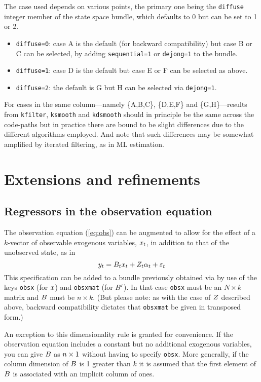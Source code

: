 The case used depends on various points, the primary one being the
\texttt{diffuse} integer member of the state space bundle, which
defaults to 0 but can be set to 1 or 2.
\begin{itemize}
\item \texttt{diffuse=0}: case A is the default (for backward
  compatibility) but case B or C can be selected, by adding
  \texttt{sequential=1} or \texttt{dejong=1} to the bundle.
\item \texttt{diffuse=1}: case D is the default but case
  E or F can be selected as above.
\item \texttt{diffuse=2}: the default is G but H can be selected
  via \texttt{dejong=1}.
\end{itemize}

For cases in the same column---namely \{A,B,C\}, \{D,E,F\} and
\{G,H\}---results from \texttt{kfilter}, \texttt{ksmooth} and
\texttt{kdsmooth} should in principle be the same across the code-paths
but in practice there are bound to be slight differences due to the
different algorithms employed. And note that such differences may be
somewhat amplified by iterated filtering, as in ML estimation.

\section{Extensions and refinements}
\label{sec:extensions}

\subsection{Regressors in the observation equation}
\label{sec:obsx}

The observation equation (\ref{eq:obs}) can be augmented to allow for
the effect of a $k$-vector of observable exogenous variables,
$x_t$, in addition to that of the unobserved state, as in
\[
  y_t = B_tx_t + Z_t \alpha_t +
  \varepsilon_t
\]
This specification can be added to a bundle previously obtained via
 by use of the keys \texttt{obsx} (for $x$) and
\texttt{obsxmat} (for $B'$). In that case \texttt{obsx} must be
an $N \times k$ matrix and $B$ must be $n \times k$. (But
please note: as with the case of $Z$ described above, backward
compatibility dictates that \texttt{obsxmat} be given in transposed
form.)

An exception to this dimensionality rule is granted for convenience.
If the observation equation includes a constant but no additional
exogenous variables, you can give $B$ as $n \times 1$
without having to specify \texttt{obsx}.  More generally, if the
column dimension of $B$ is 1 greater than $k$ it is assumed
that the first element of $B$ is associated with an implicit
column of ones.

